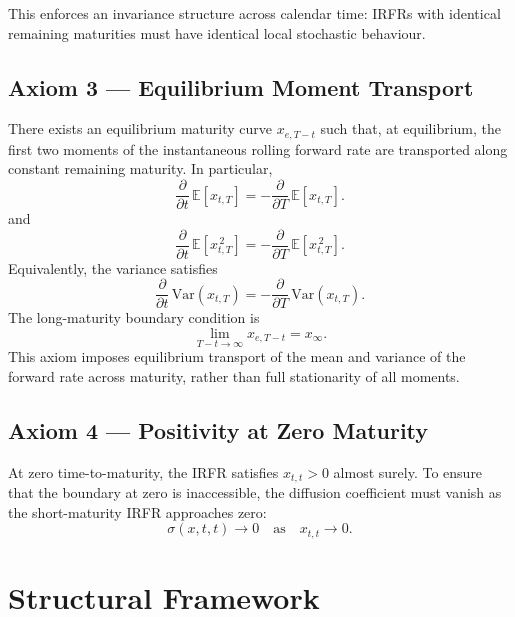 \documentclass[12pt]{article}
\theoremstyle{statementstyle}
\begin{document}
This enforces an invariance structure across calendar time: IRFRs with 
identical remaining maturities must have identical local stochastic 
behaviour.

\subsection*{Axiom 3 --- Equilibrium Moment Transport}
\label{ax:equilibrium}

There exists an equilibrium maturity curve $x_{e,T-t}$ such that, at
equilibrium, the first two moments of the instantaneous rolling forward
rate are transported along constant remaining maturity. In particular,
\begin{equation}
\frac{\partial}{\partial t}\,\mathbb{E}[x_{t,T}]
=
-\frac{\partial}{\partial T}\,\mathbb{E}[x_{t,T}].
\tag{2.0.3}
\end{equation}
and
\begin{equation}
\frac{\partial}{\partial t}\,\mathbb{E}[x_{t,T}^{\,2}]
=
-\frac{\partial}{\partial T}\,\mathbb{E}[x_{t,T}^{\,2}].
\tag{2.0.4}
\end{equation}
Equivalently, the variance satisfies
\begin{equation}
\frac{\partial}{\partial t}\,\mathrm{Var}(x_{t,T})
=
-\frac{\partial}{\partial T}\,\mathrm{Var}(x_{t,T}).
\tag{2.0.5}
\end{equation}
The long-maturity boundary condition is
\[
\lim_{T-t\to\infty} x_{e,T-t} = x_{\infty}.
\]
This axiom imposes equilibrium transport of the mean and variance of the
forward rate across maturity, rather than full stationarity of all
moments.

\subsection*{Axiom 4 --- Positivity at Zero Maturity}
\label{ax:positivity}

At zero time-to-maturity, the IRFR satisfies $x_{t,t}>0$ almost surely. 
To ensure that the boundary at zero is inaccessible, the diffusion 
coefficient must vanish as the short-maturity IRFR approaches zero:
\[
\sigma(x,t,t)\longrightarrow 0
\quad\text{as}\quad x_{t,t}\to 0.
\]
\section{Structural Framework}
\label{sec:framework}
\end{document}
